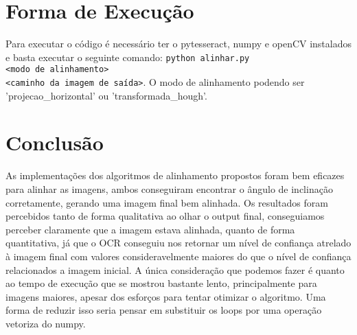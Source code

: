 \documentclass{article}
\begin{document}
\section{Forma de Execução}
Para executar o código é necessário ter o pytesseract, numpy e openCV instalados e basta executar o seguinte comando: \texttt{python alinhar.py \\<caminho da imagem de entrada> <modo de alinhamento>\\ <caminho da imagem de saída>}. O modo de alinhamento podendo ser 'projecao\_horizontal' ou 'transformada\_hough'.

\section{Conclusão}
As implementações dos algoritmos de alinhamento propostos foram bem eficazes para alinhar as imagens, ambos conseguiram encontrar o ângulo de inclinação corretamente, gerando uma imagem final bem alinhada. Os resultados foram percebidos tanto de forma qualitativa ao olhar o output final, conseguiamos perceber claramente que a imagem estava alinhada, quanto de forma quantitativa, já que o OCR conseguiu nos retornar um nível de confiança atrelado à imagem final com valores consideravelmente maiores do que o nível de confiança relacionados a imagem inicial. A única consideração que podemos fazer é quanto ao tempo de execução que se mostrou bastante lento, principalmente para imagens maiores, apesar dos esforços para tentar otimizar o algoritmo. Uma forma de reduzir isso seria pensar em substituir os loops por uma operação vetoriza do numpy.
\end{document}

